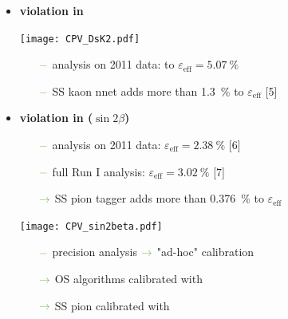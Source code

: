 {\begin{minipage}{0.474\boxwidth}
\begin{itemize}
\item\textbf{\CP violation in \BsToDsK}

\vspace{-2.1em}
\begin{flushleft}
\texttt{[image: CPV\_DsK2.pdf]}
\end{flushleft}
\vspace{-2.8em}

	\begin{itemize}
	\setlength\itemsep{0.01em}
	\setlength{\itemindent}{-.11in}
	\item[${\color{tu_gruen}-}$] analysis on \num{2011} data: to $\varepsilon_\text{eff}=\SI{5.07}{\%}$
	\item[${\color{tu_gruen}-}$] SS kaon nnet adds more than \SI{1.3}{\%} to $\varepsilon_\text{eff}$ [5]
	\end{itemize}
\end{itemize}
\end{minipage}
\vspace{0.7em}
\hfill
\begin{minipage}{0.474\boxwidth}
\vspace{-0.2em}
\begin{itemize}
\item\textbf{\CP violation in \BdToJPsiKS ($\sin2\beta$)}
	\begin{itemize}
	\setlength\itemsep{0.01em}
	\setlength{\itemindent}{-.11in}
	\item[${\color{tu_gruen}-}$] analysis on \num{2011} data: $\varepsilon_\text{eff}=\SI{2.38}{\%}$ [6]
	\item[${\color{tu_gruen}-}$] full Run I analysis: $\varepsilon_\text{eff}=\SI{3.02}{\%}$ [7] 
	\setlength{\itemindent}{.05in} 
	\item[${\color{tu_gruen}\rightarrow}$] SS pion tagger adds more than \SI{0.376}{\%} to $\varepsilon_\text{eff}$ 
	\end{itemize}
	
\vspace{-1.7em}
\begin{center}
\texttt{[image: CPV\_sin2beta.pdf]}
\end{center}
\vspace{-2.5em}

	\begin{itemize}
	\setlength{\itemindent}{-.11in}
	\setlength\itemsep{0.01em}
	\item[${\color{tu_gruen}-}$] precision analysis \hspace{0.1em}${\color{tu_gruen}\rightarrow}$ "ad-hoc" calibration
	\setlength{\itemindent}{.05in}
	\item[${\color{tu_gruen}\rightarrow}$] OS algorithms calibrated with \BuToJPsiKp 
	\item[${\color{tu_gruen}\rightarrow}$] SS pion calibrated with \BdToJPsiKst
	\end{itemize}


\end{itemize}
\end{minipage}}
